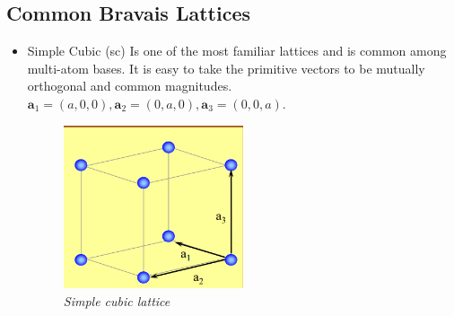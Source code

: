 \documentclass[11pt]{article}
\numberwithin{equation}{section}
\begin{document}
\subsection{Common Bravais Lattices}
\begin{itemize}
    \item Simple Cubic (sc)
Is one of the most familiar lattices and is common among multi-atom bases. It is easy to take the primitive vectors to be mutually orthogonal and common magnitudes. $\textbf{a}_1 = (a,0,0),\textbf{a}_2 = (0,a,0),\textbf{a}_3 = (0,0,a)$. 
\begin{figure}[H]
\centering
\includegraphics[width=0.5\textwidth]{Graph3.png}
\caption{\label{fig:2}\emph{Simple cubic lattice}}
\end{figure}


\end{itemize}
\end{document}
